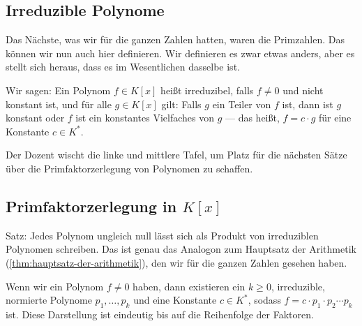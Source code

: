\subsection{Irreduzible Polynome}

\begin{spoken-clean}[00:31:36 - 00:35:30]
Das Nächste, was wir für die ganzen Zahlen hatten, waren die Primzahlen. Das können wir nun auch hier definieren. Wir definieren es zwar etwas anders, aber es stellt sich heraus, dass es im Wesentlichen dasselbe ist. 

Wir sagen: Ein Polynom $f \in K[x]$ heißt irreduzibel, falls $f \neq 0$ und nicht konstant ist, und für alle $g \in K[x]$ gilt: Falls $g$ ein Teiler von $f$ ist, dann ist $g$ konstant oder $f$ ist ein konstantes Vielfaches von $g$ --- das heißt, $f = c \cdot g$ für eine Konstante $c \in K^*$.
\end{spoken-clean}

\begin{math-stroke}
\end{math-stroke}

\begin{meta-note}[Tafelreinigung]
Der Dozent wischt die linke und mittlere Tafel, um Platz für die nächsten Sätze über die Primfaktorzerlegung von Polynomen zu schaffen.
\end{meta-note}

\subsection{Primfaktorzerlegung in \texorpdfstring{$K[x]$}{K[x]}}

\begin{spoken-clean}[00:35:30 - 00:38:02]
Satz: Jedes Polynom ungleich null lässt sich als Produkt von irreduziblen Polynomen schreiben. Das ist genau das Analogon zum Hauptsatz der Arithmetik (\cref{thm:hauptsatz-der-arithmetik}), den wir für die ganzen Zahlen gesehen haben. 

Wenn wir ein Polynom $f \neq 0$ haben, dann existieren ein $k \ge 0$, irreduzible, normierte Polynome $p_1, \dots, p_k$ und eine Konstante $c \in K^*$, sodass $f = c \cdot p_1 \cdot p_2 \cdots p_k$ ist. Diese Darstellung ist eindeutig bis auf die Reihenfolge der Faktoren.
\end{spoken-clean}

